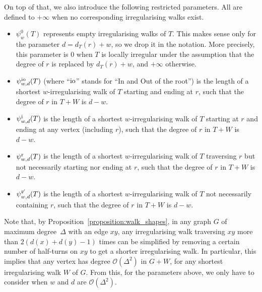 \documentclass[a4paper,11pt,dvipsnames]{elsarticle}
\newcommand{\sam}[1]{\todo[size=\tiny,color=red!20!white]{\textbf{Sam:} #1}}
\newcommand{\sam}[1]{}
\begin{document}
On top of that, we also introduce the following restricted parameters. All are defined
to $+\infty$ when no corresponding irregularising walks exist.

\begin{itemize}
    \item $\psi^0_{w}(T)$ represents empty irregularising walks of $T$. This makes sense
    only for the parameter $d= d_T(r)+w$, so we drop it in the notation. More precisely, this parameter
    is $0$ when $T$ is locally irregular under the assumption that the degree of $r$ is replaced by $d_T(r)+w$,
    and $+\infty$ otherwise.
    
    \item $\psi^{\rm io}_{w,d}(T)$ (where ``${\rm io}$'' stands for ``In and Out of the root'') is the length of a shortest $w$-irregularising walk of $T$ starting and ending at $r$, such that the degree of $r$ in $T+W$ is $d-w$.
    
    \item $\psi^{\rm i}_{w,d}(T)$ is the length of a shortest $w$-irregularising walk of $T$ starting at $r$ and ending at any vertex (including $r$), such that the degree of $r$ in $T+W$ is $d-w$.
    
    \item $\psi^{\rm r}_{w,d}(T)$ is the length of a shortest $w$-irregularising walk of $T$ traversing $r$ but not necessarily starting nor ending at $r$, such that the degree of $r$ in $T+W$ is $d-w$.
    
    \item $\psi^{\not{\rm r}}_{w,d}(T)$ is the length of a shortest $w$-irregularising walk of $T$ not necessarily containing $r$, such that the degree of $r$ in $T+W$ is $d-w$.
\end{itemize}

Note that, by Proposition~\ref{proposition:walk_shapes}, in any graph $G$ of maximum degree~$\Delta$ with an edge $xy$, any irregularising walk traversing $xy$ more than $2(d(x)+d(y)-1)$ times can be simplified by removing a certain number of half-turns on $xy$ to get a shorter irregularising walk.
In particular, this implies that any vertex has degree $\mathcal{O}(\Delta^2)$ in $G+W$, for any shortest irregularising walk $W$ of $G$.
From this, for the parameters above, we only have to consider when $w$ and $d$ are $\mathcal{O}(\Delta^2)$.
\end{document}
